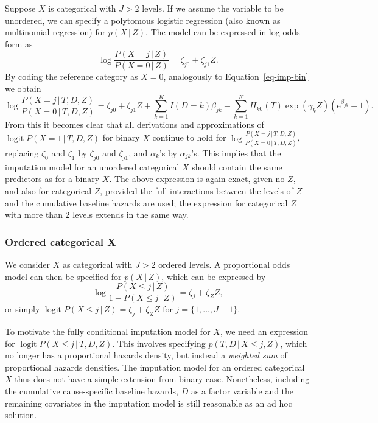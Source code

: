 \documentclass[
  letterpaper,
  paper=240mm:170mm,
  twoside=true,
  open=right,
  fontsize=10pt,
  pagesize=false,
  BCOR=15mm,
  DIV=14,
  headinclude=true,
  footinclude=false,
  headsepline=on]{scrbook}
\DeclareMathOperator{\logit}{logit}
\newcommand{\given}{\,|\,}
\begin{document}
Suppose \(X\) is categorical with \(J>2\) levels. If we assume the
variable to be unordered, we can specify a polytomous logistic
regression (also known as multinomial regression) for \(p(X \given Z)\).
The model can be expressed in log odds form as \begin{equation*}
    \log \frac{P(X = j \given Z)}{P(X = 0\given Z)}  = \zeta_{j0} + \zeta_{j1} Z.
\end{equation*} By coding the reference category as \(X=0\), analogously
to Equation~\ref{eq-imp-bin} we obtain \begin{equation*}
    \log \frac{P(X = j \given T,D,Z)}{P(X = 0\given T,D,Z)} = \zeta_{j0} + \zeta_{j1} Z + \sum^K_{k = 1} I(D=k) \beta_{jk} - \sum^K_{k = 1} H_{k0}(T)\exp(\gamma_k Z)(\mathrm{e}^{\beta_{jk}}  - 1).
\end{equation*} From this it becomes clear that all derivations and
approximations of \(\logit P(X = 1 \given T, D, Z)\) for binary \(X\)
continue to hold for
\(\log \frac{P(X = j \given T,D,Z)}{P(X = 0\given T,D,Z)}\), replacing
\(\zeta_0\) and \(\zeta_1\) by \(\zeta_{j0}\) and \(\zeta_{j1}\), and
\(\alpha_k\)'s by \(\alpha_{jk}\)'s. This implies that the imputation
model for an unordered categorical \(X\) should contain the same
predictors as for a binary \(X\). The above expression is again exact,
given no \(Z\), and also for categorical \(Z\), provided the full
interactions between the levels of \(Z\) and the cumulative baseline
hazards are used; the expression for categorical \(Z\) with more than 2
levels extends in the same way.

\subsubsection*{Ordered categorical X}\label{ordered-categorical-x-1}

We consider \(X\) as categorical with \(J>2\) ordered levels. A
proportional odds model can then be specified for \(p(X \given Z)\),
which can be expressed by \begin{equation*}
    \log \frac{P(X \leq j \given Z)}{1 - P(X \leq j \given Z)} = \zeta_{j} + \zeta_Z Z,
\end{equation*} or simply
\(\logit P(X \leq j \given Z) = \zeta_{j} + \zeta_Z Z\) for
\(j = \{1,...,J-1\}\).

To motivate the fully conditional imputation model for \(X\), we need an
expression for \(\logit P(X \leq j \given T,D,Z)\). This involves
specifying \(p(T, D \given X \leq j,Z)\), which no longer has a
proportional hazards density, but instead a \textit{weighted sum} of
proportional hazards densities. The imputation model for an ordered
categorical \(X\) thus does not have a simple extension from binary
case. Nonetheless, including the cumulative cause-specific baseline
hazards, \(D\) as a factor variable and the remaining covariates in the
imputation model is still reasonable as an ad hoc solution.
\end{document}
